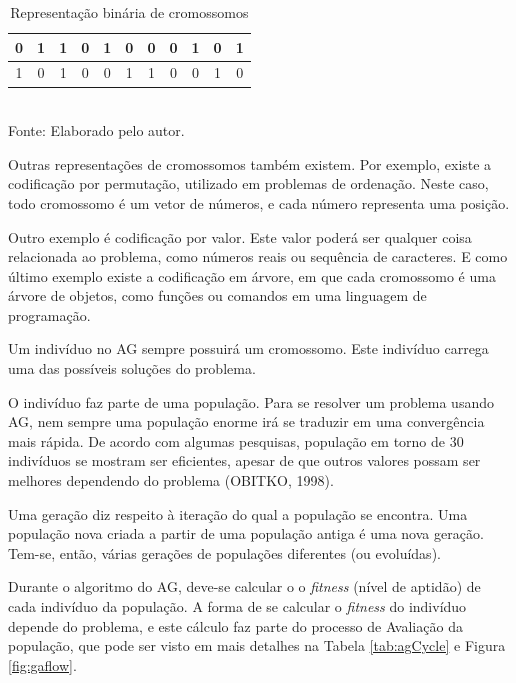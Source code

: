 \documentclass[12pt,a4paper]{article}
\newcommand{\source}[1]{\small Fonte: {#1}}
\begin{document}
	\begin{table}[ht]
		\caption{Representação binária de cromossomos}
		\centering
		\begin{tabular}{c c c c c c c c c c c}
			\hline 
			0 & 1 & 1 & 0 & 1 & 0 & 0 & 0 & 1 & 0 & 1\\ 
			\hline 
			1 & 0 & 1 & 0 & 0 & 1 & 1 & 0 & 0 & 1 & 0\\ 
			\hline 
		\end{tabular} \\
		\vspace{3mm}
		\source{Elaborado pelo autor.}
		\label{tab:cromosome}
	\end{table}
	
	Outras representações de cromossomos também existem.
	Por exemplo, existe a codificação por permutação,
	utilizado em problemas de ordenação.
	Neste caso, todo cromossomo é um vetor de números,
	e cada número representa uma posição.
	
	Outro exemplo é codificação por valor.
	Este valor poderá ser qualquer coisa relacionada ao problema,
	como números reais ou sequência de caracteres.
	E como último exemplo existe a codificação em árvore,
	em que cada cromossomo é uma árvore de objetos,
	como funções ou comandos em uma linguagem de programação.
	
	Um indivíduo no AG sempre possuirá um cromossomo.
	Este indivíduo carrega uma das possíveis soluções do problema.
	
	O indivíduo faz parte de uma população.
	Para se resolver um problema usando AG,
	nem sempre uma população enorme irá se traduzir em uma convergência mais rápida.
	De acordo com algumas pesquisas,
	população em torno de 30 indivíduos se mostram ser eficientes,
	apesar de que outros valores possam ser melhores dependendo do problema
	(OBITKO, 1998).
	
	Uma geração diz respeito à iteração do qual a população se encontra.
	Uma população nova criada a partir de uma população antiga é uma nova geração.
	Tem-se, então, várias gerações de populações diferentes (ou evoluídas).
	
	Durante o algoritmo do AG, deve-se calcular o o \textit{fitness} (nível de aptidão) de cada indivíduo da população.
	A forma de se calcular o \textit{fitness} do indivíduo depende do problema,
	e este cálculo faz parte do processo de Avaliação da população,
	que pode ser visto em mais detalhes na Tabela \ref{tab:agCycle} e Figura \ref{fig:gaflow}.
	
\end{document}
